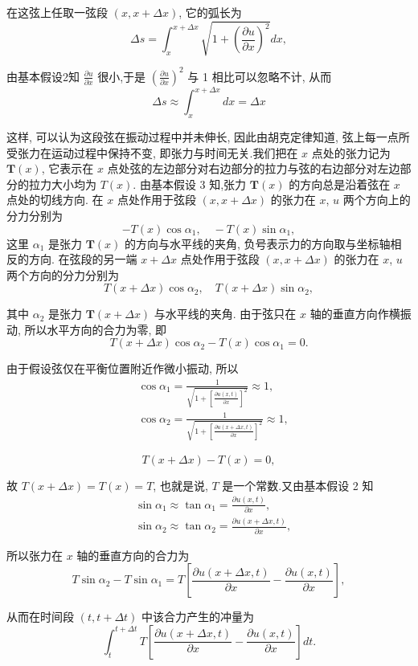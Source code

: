 在这弦上任取一弦段 $(x, x+\Delta x)$, 它的弧长为
$$
\Delta s=\int_x^{x+\Delta x} \sqrt{1+\left(\frac{\partial u}{\partial x}\right)^2} d x,
$$

由基本假设2知 $\frac{\partial u}{\partial x}$ 很小,于是 $\left(\frac{\partial u}{\partial x}\right)^2$ 与 1 相比可以忽略不计, 从而
$$
\Delta s \approx \int_x^{x+\Delta x} d x=\Delta x
$$

这样, 可以认为这段弦在振动过程中并未伸长, 因此由胡克定律知道, 弦上每一点所受张力在运动过程中保持不变, 
即张力与时间无关.我们把在 $x$ 点处的张力记为 $\boldsymbol{T}(x)$, 它表示在 $x$ 
点处弦的左边部分对右边部分的拉力与弦的右边部分对左边部分的拉力大小均为 $T(x)$. 
由基本假设 3 知,张力 $\boldsymbol{T}(x)$ 的方向总是沿着弦在 $x$ 点处的切线方向.
 在 $x$ 点处作用于弦段 $(x, x+\Delta x)$ 的张力在 $x$, $u$ 两个方向上的分力分别为
$$
-T(x) \cos \alpha_1, \quad-T(x) \sin \alpha_1,
$$
这里 $\alpha_1$ 是张力 $\boldsymbol{T}(x)$ 的方向与水平线的夹角, 
负号表示力的方向取与坐标轴相反的方向. 在弦段的另一端 $x+\Delta x$ 点处作用于弦段 $(x, x+\Delta x)$ 
的张力在 $x$, $u$两个方向的分力分别为
$$
T(x+\Delta x) \cos \alpha_2, \quad T(x+\Delta x) \sin \alpha_2,
$$

其中 $\alpha_2$ 是张力 $\boldsymbol{T}(x+\Delta x)$ 与水平线的夹角.
由于弦只在 $x$ 轴的垂直方向作横振动, 所以水平方向的合力为零, 即
$$
T(x+\Delta x) \cos \alpha_2-T(x) \cos \alpha_1=0 .
$$

由于假设弦仅在平衡位置附近作微小振动, 所以
$$
\begin{aligned}
& \cos \alpha_1=\frac{1}{\sqrt{1+\left[\frac{\partial u(x, t)}{\partial x}\right]^2}} \approx 1, \\
& \cos \alpha_2=\frac{1}{\sqrt{1+\left[\frac{\partial u(x+\Delta x, t)}{\partial x}\right]^2}} \approx 1,
\end{aligned}
$$

$$
T(x+\Delta x)-T(x)=0,
$$

故 $T(x+\Delta x)=T(x)=T$, 也就是说, $T$ 是一个常数.又由基本假设 2 知
$$
\begin{aligned}
& \sin \alpha_1 \approx \tan \alpha_1=\frac{\partial u(x, t)}{\partial x}, \\
& \sin \alpha_2 \approx \tan \alpha_2=\frac{\partial u(x+\Delta x, t)}{\partial x},
\end{aligned}
$$

所以张力在 $x$ 轴的垂直方向的合力为
$$
T \sin \alpha_2-T \sin \alpha_1=T\left[\frac{\partial u(x+\Delta x, t)}{\partial x}-\frac{\partial u(x, t)}{\partial x}\right],
$$

从而在时间段 $(t, t+\Delta t)$ 中该合力产生的冲量为
$$
\int_t^{t+\Delta t} T\left[\frac{\partial u(x+\Delta x, t)}{\partial x}-\frac{\partial u(x, t)}{\partial x}\right] d t .
$$

